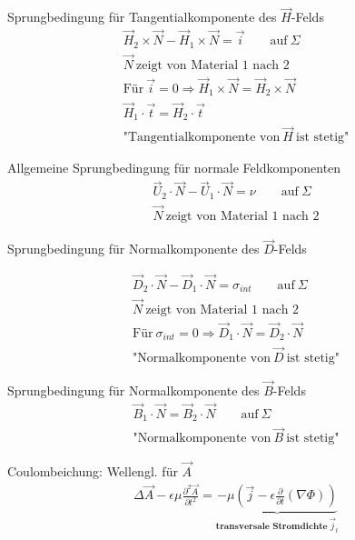 \documentclass[a6paper]{kartei}
\begin{document}
\begin{karte}{Sprungbedingung für Tangentialkomponente des $\vec{H}$-Felds}
\begin{eqnarray}
 \vec{H}_{2} \times \vec{N} - \vec{H}_{1} \times \vec{N} = \vec{i} \qquad \text{auf} \ \Sigma \\
  \vec{N} \ \text{zeigt von Material 1 nach 2} \nonumber \\
  \text{Für} \ \vec{i} = 0 \Rightarrow  \vec{H}_{1} \times \vec{N}  =  \vec{H}_{2} \times \vec{N} \nonumber \\
  \vec{H}_{1} \cdot \vec{t}  =   \vec{H}_{2} \cdot \vec{t} \nonumber \\
  \text{"Tangentialkomponente von} \ \vec{H} \ \text{ist stetig"} \nonumber
\end{eqnarray}
\end{karte}
\begin{karte}{Allgemeine Sprungbedingung für normale Feldkomponenten}
 \begin{eqnarray}
 \vec{U}_{2} \cdot \vec{N} - \vec{U}_{1} \cdot \vec{N} = \nu \qquad \text{auf} \ \Sigma \\
  \vec{N} \ \text{zeigt von Material 1 nach 2} \nonumber
 \end{eqnarray}
\end{karte}

\begin{karte}{Sprungbedingung für Normalkomponente des $\vec{D}$-Felds}

\begin{eqnarray}
  \vec{D}_{2} \cdot \vec{N} - \vec{D}_{1} \cdot \vec{N} = \sigma_{int} \qquad \text{auf} \ \Sigma \\
  \vec{N} \ \text{zeigt von Material 1 nach 2} \nonumber \\
  \text{Für} \ \sigma_{int} = 0 \Rightarrow  \vec{D}_{1} \cdot \vec{N} = \vec{D}_{2} \cdot \vec{N} \nonumber \\
  \text{"Normalkomponente von} \ \vec{D} \ \text{ist stetig"} \nonumber
 \end{eqnarray}
\end{karte}

\begin{karte}{Sprungbedingung für Normalkomponente des $\vec{B}$-Felds}
\begin{eqnarray}
  \vec{B}_{1} \cdot \vec{N} = \vec{B}_{2} \cdot \vec{N} \qquad \text{auf} \ \Sigma \\
  \text{"Normalkomponente von} \ \vec{B} \ \text{ist stetig"} \nonumber
\end{eqnarray}
\end{karte}
\begin{karte}{Coulombeichung: Wellengl. für $\vec{A}$}
\begin{eqnarray}
  \Delta \vec{A} - \epsilon \mu \frac{\partial^{2} \vec{A}}{\partial t^{2}} = \underbrace{- \mu \left( \vec{j} - \epsilon \frac{\partial}{\partial t} (\nabla \Phi) \right)}_{\textbf{transversale Stromdichte} \ \vec{j}_{t}}
 \end{eqnarray}
\end{karte}
\end{document}
